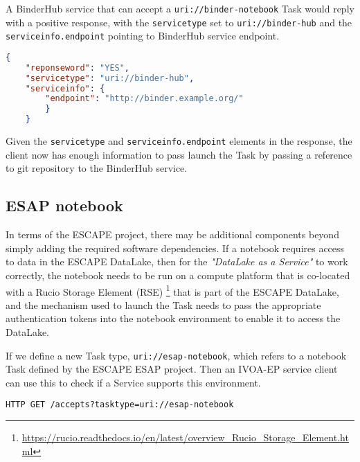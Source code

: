 \documentclass[11pt,a4paper]{ivoa}
\newcommand{\ivoep} {IVOA-EP\xspace}
\newcommand{\binderhub} {BinderHub\xspace}
\newcommand{\escape} {ESCAPE\xspace}
\newcommand{\datalake} {DataLake\xspace}
\newcommand{\codeword}[1] {\texttt{#1}}
\newcommand{\footurl}[1] {\footnote{\url{#1}}}
\begin{document}
A \binderhub service that can accept a \codeword{uri://binder-notebook} Task would reply with a positive response, with the \codeword{servicetype} set to \codeword{uri://binder-hub} and the \codeword{serviceinfo.endpoint} pointing to \binderhub service endpoint.
\begin{lstlisting}[language=json]
    {
    "reponseword": "YES",
    "servicetype": "uri://binder-hub",
    "serviceinfo": {
        "endpoint": "http://binder.example.org/"
        }
    }
\end{lstlisting}

Given the \codeword{servicetype} and \codeword{serviceinfo.endpoint} elements in the response, the client now has enough information to pass launch the Task by passing a reference to git repository to the \binderhub service.

\subsection{ESAP notebook}
\label{sec:uri://esap-notebook}
In terms of the \escape project, there may be additional components beyond simply adding the required software dependencies. If a notebook requires access to data in the \escape \datalake, then for the \textit{"DataLake as a Service"} to work correctly, the notebook needs to be run on a compute platform that is co-located with a Rucio Storage Element (RSE) 
\footurl{https://rucio.readthedocs.io/en/latest/overview_Rucio_Storage_Element.html} that is part of the \escape \datalake, and the mechanism used to launch the Task needs to pass the appropriate authentication tokens into the notebook environment to enable it to access the \datalake.

If we define a new Task type, \codeword{uri://esap-notebook}, which refers to a notebook Task defined by the \escape ESAP project. Then an \ivoep service client can use this to check if a Service supports this environment.

\begin{lstlisting}[]
    HTTP GET /accepts?tasktype=uri://esap-notebook
\end{lstlisting}
\end{document}
